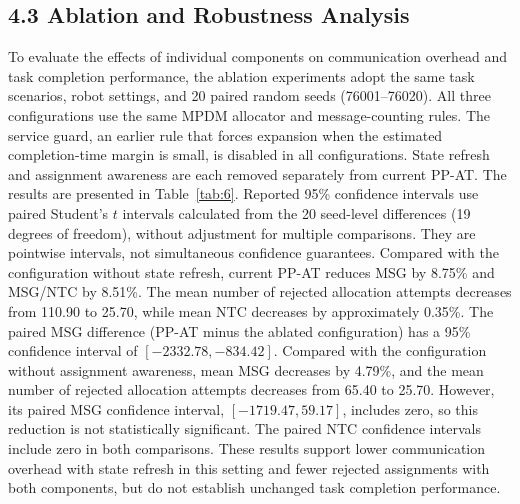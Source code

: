 \documentclass[type=submission,name=IR]{oae}
\begin{document}
\subsection{4.3 Ablation and Robustness Analysis}
To evaluate the effects of individual components on communication overhead and task completion performance, the ablation experiments adopt the same task scenarios, robot settings, and 20 paired random seeds (76001--76020). All three configurations use the same MPDM allocator and message-counting rules. The service guard, an earlier rule that forces expansion when the estimated completion-time margin is small, is disabled in all configurations. State refresh and assignment awareness are each removed separately from current PP-AT. The results are presented in Table~\ref{tab:6}. Reported 95\% confidence intervals use paired Student's $t$ intervals calculated from the 20 seed-level differences (19 degrees of freedom), without adjustment for multiple comparisons. They are pointwise intervals, not simultaneous confidence guarantees. Compared with the configuration without state refresh, current PP-AT reduces MSG by 8.75\% and MSG/NTC by 8.51\%. The mean number of rejected allocation attempts decreases from 110.90 to 25.70, while mean NTC decreases by approximately 0.35\%. The paired MSG difference (PP-AT minus the ablated configuration) has a 95\% confidence interval of $[-2332.78,-834.42]$. Compared with the configuration without assignment awareness, mean MSG decreases by 4.79\%, and the mean number of rejected allocation attempts decreases from 65.40 to 25.70. However, its paired MSG confidence interval, $[-1719.47,59.17]$, includes zero, so this reduction is not statistically significant. The paired NTC confidence intervals include zero in both comparisons. These results support lower communication overhead with state refresh in this setting and fewer rejected assignments with both components, but do not establish unchanged task completion performance.
\end{document}
